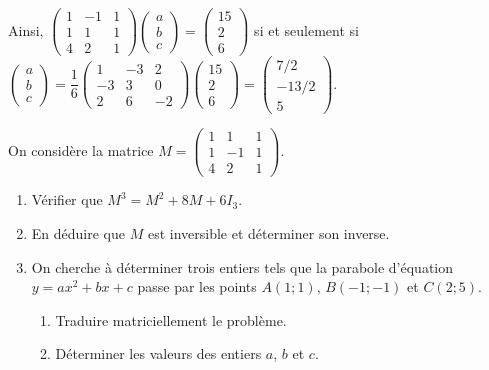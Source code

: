 \documentclass[11pt,fleqn]{book} %
\begin{document}
\begin{solution}
Ainsi, $\begin{pmatrix}1 & -1 & 1 \\ 1 & 1& 1 \\ 4 & 2 & 1\end{pmatrix}\begin{pmatrix}a \\ b \\c \end{pmatrix} = \begin{pmatrix}15\\2\\6\end{pmatrix}$ si et seulement si $\begin{pmatrix}a\\b\\c\end{pmatrix} = \dfrac{1}{6}\begin{pmatrix}1 & -3 & 2 \\ -3 & 3 & 0 \\ 2 & 6 & -2 \end{pmatrix}\begin{pmatrix}15\\2\\6\end{pmatrix}=\begin{pmatrix}7/2 \\ -13/2 \\ 5\end{pmatrix}$.

\end{solution}

\begin{exercise}[topic=mat03]
On considère la matrice $M=\begin{pmatrix}1&1&1\\1&-1&1\\4&2&1\end{pmatrix}$.

\begin{enumerate}
\item Vérifier que $M^3=M^2+8M+6I_3$.
\item En déduire que $M$ est inversible et déterminer son inverse.
\item On cherche à déterminer trois entiers tels que la parabole d'équation $y=ax^2+bx+c$ passe par les points $A(1;1)$, $B(-1;-1)$ et $C(2;5)$.
\begin{enumerate}
\item Traduire matriciellement le problème.
\item Déterminer les valeurs des entiers $a$, $b$ et $c$.
\end{enumerate}
\end{enumerate}
\end{exercise}
\end{document}
